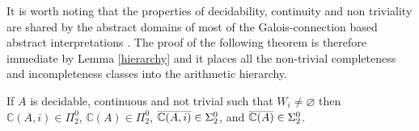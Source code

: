 \documentclass[runningheads]{llncs}
\def\ok#1{\mbox{\raisebox{0ex}[1ex][1ex]{$#1$}}}
\def\bbbc{{\mathbb{C}}}
\newcommand{\PC}{\mathsf{PC}}
\newcommand{\Ix}{\mathsf{Ix}}
\newcommand{\Forc}{\mathsf{Forc}}
\newcommand{\compl}[1]{\ok{\overline{#1}}}
\def\ok#1{\mbox{\raisebox{0ex}[1ex][1ex]{$#1$}}}
\def\cAA{\ensuremath{A}}
\begin{document}
It is worth noting that the properties of decidability, continuity and non triviality are shared by the abstract domains of most of the Galois-connection based abstract interpretations \cite{CGR18}.
The proof of the following theorem is therefore immediate by Lemma \ref{hierarchy} and it places all the non-trivial completeness and incompleteness classes into the arithmetic hierarchy.

\begin{theorem}
    If $\cAA$ is decidable, continuous and not trivial such that $W_i\neq\varnothing$ then $\bbbc(\cAA,i)\in\Pi^0_2$, $\bbbc(\cAA)\in\Pi^0_2$, $\compl{\bbbc(\cAA,i)}\in\Sigma^0_2$, and $\compl{\bbbc(\cAA)}\in\Sigma^0_2$.
\end{theorem}







\end{document}
